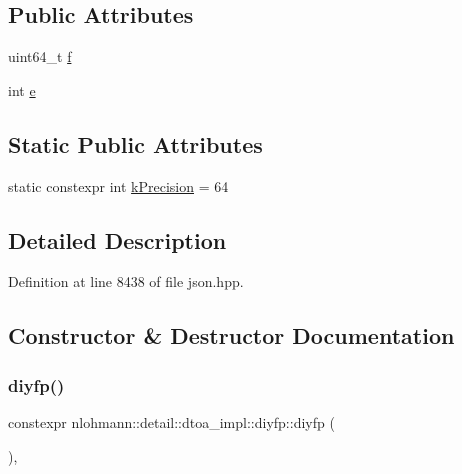 \subsection*{Public Attributes}
\begin{DoxyCompactItemize}
\item 
uint64\+\_\+t \hyperlink{structnlohmann_1_1detail_1_1dtoa__impl_1_1diyfp_a90f04c892ac1e707fdb50b0e1eb59030}{f}
\item 
int \hyperlink{structnlohmann_1_1detail_1_1dtoa__impl_1_1diyfp_ae22e170815983961447c429f324c944d}{e}
\end{DoxyCompactItemize}
\subsection*{Static Public Attributes}
\begin{DoxyCompactItemize}
\item 
static constexpr int \hyperlink{structnlohmann_1_1detail_1_1dtoa__impl_1_1diyfp_a03682754b06ed4f30b263119eecc2d52}{k\+Precision} = 64
\end{DoxyCompactItemize}


\subsection{Detailed Description}


Definition at line 8438 of file json.\+hpp.



\subsection{Constructor \& Destructor Documentation}
\mbox{\label{structnlohmann_1_1detail_1_1dtoa__impl_1_1diyfp_a23d25b3ad4527270a6e3f2a0bcca11e6}} 
\subsubsection{\texorpdfstring{diyfp()}{diyfp()}\hspace{0.1cm}{\footnotesize\ttfamily [1/2]}}
{\footnotesize\ttfamily constexpr nlohmann\+::detail\+::dtoa\+\_\+impl\+::diyfp\+::diyfp (\begin{DoxyParamCaption}{ }\end{DoxyParamCaption})\hspace{0.3cm}{\ttfamily [inline]}, {\ttfamily [noexcept]}}



